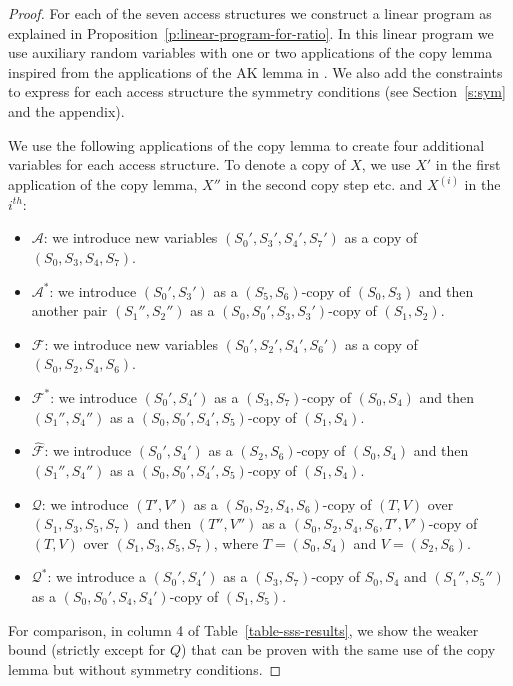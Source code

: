\documentclass[11pt, a4paper]{kybernetika}
\begin{document}
	\begin{proof}
		For each of the seven access structures we construct a linear program as explained in Proposition~\ref{p:linear-program-for-ratio}. In this linear program we use auxiliary random variables with one or two applications of the copy lemma inspired from the applications of the AK lemma in \cite{farras2020improving}. We also add the constraints to express for each access structure the symmetry conditions (see Section~\ref{s:sym} and the appendix).
		
		We use the following applications of the copy lemma to create four additional variables for each access structure. To denote a copy of $X$, we use $X'$ in the first application of the copy lemma, $X''$ in the second copy step etc. and $X^{(i)}$ in the $i^{th}$:
		
		\begin{itemize}	
			\item $\mathcal{A}$: we introduce new variables $(S_0',S_3',S_4',S_7')$ as a copy of $(S_0,S_3,S_4,S_7)$.
			\item $\mathcal{A}^*$: we introduce $(S_0',S_3')$ as a $(S_5,S_6)$-copy of $(S_0,S_3)$ and then another pair $(S_1'',S_2'')$  as a $(S_0,S_0',S_3,S_3')$-copy of $(S_1,S_2)$.
			\item $\mathcal{F}$: we introduce new variables $(S_0',S_2',S_4',S_6')$ as a copy of $(S_0,S_2,S_4,S_6)$.
			\item $\mathcal{F}^*$: we introduce $(S_0',S_4')$ as a $(S_3,S_7)$-copy of $(S_0,S_4)$ and then $(S_1'',S_4'')$ as a $(S_0,S_0',S_4',S_5)$-copy of $(S_1,S_4)$.
			\item $\widehat{\mathcal{F}}$: we introduce $(S_0',S_4')$ as a $(S_2,S_6)$-copy of $(S_0,S_4)$ and then $(S_1'',S_4'')$ as a $(S_0,S_0',S_4',S_5)$-copy of $(S_1,S_4)$.
			\item $\mathcal{Q}$: we introduce $(T',V')$ as a $(S_0,S_2,S_4,S_6)$-copy of $(T,V)$ over $(S_1,S_3,S_5,S_7)$ and then $(T'',V'')$ as a  $(S_0,S_2,S_4,S_6,T',V')$-copy of $(T,V)$ over 
			$(S_1,S_3,S_5,S_7)$, where $T=(S_0,S_4)$ and $V=(S_2,S_6)$.
			\item $\mathcal{Q}^*$: we introduce a $(S_0',S_4')$ as a $(S_3,S_7)$-copy of $S_0,S_4$ and $(S_1'',S_5'')$ as a $(S_0,S_0',S_4,S_4')$-copy of $(S_1,S_5)$.
		\end{itemize}
		
		For comparison, in column 4 of Table~\ref{table-sss-results}, we show the weaker bound (strictly except for $Q$) that can be proven with the same use of the copy lemma but without symmetry conditions.
	\end{proof}
	
\end{document}

